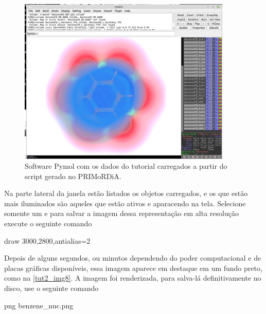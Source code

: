 \documentclass[a4paper,11pt]{refart}
\begin{document}
\hspace*{-\leftmarginwidth}
\begin{minipage}{\fullwidth}
	\begin{figure}[H]
		\begin{center}
			\includegraphics[width=4in]{images/tut2_img7}
			\caption{Software Pymol com os dados do tutorial carregados a partir do script gerado no PRIMoRDiA.}
			\label{fig_tut2_6}
		\end{center}
	\end{figure}
\end{minipage}

Na parte lateral da janela estão listados os objetos carregados, e os que estão mais iluminados são aqueles que estão ativos e aparacendo na tela. Selecione somente um e para salvar a imagem dessa representação em alta resolução execute o seguinte comando 

\hspace*{-\leftmarginwidth}
\begin{minipage}{\fullwidth}
	\begin{pymol}draw 3000,2800,antialias=2\end{pymol}
\end{minipage}

Depois de alguns segundos, ou minutos dependendo do poder computacional e de placas gráficas disponíveis, essa imagem aparece em destaque em um fundo preto, como na \autoref{tut2_img8}. 
A imagem foi renderizada, para salva-lá definitivamente no disco, use o seguinte comando

\hspace*{-\leftmarginwidth}
\begin{minipage}{\fullwidth}
	\begin{pymol}png benzene_nuc.png\end{pymol}
\end{minipage}
\end{document}
